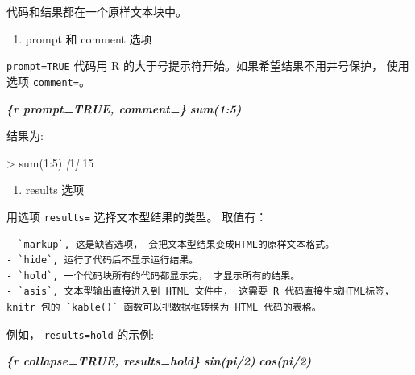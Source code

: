 \documentclass[
]{book}
\newenvironment{Shaded}{\begin{snugshade}}{\end{snugshade}}
\newcommand{\AttributeTok}[1]{\textcolor[rgb]{0.77,0.63,0.00}{#1}}
\newcommand{\CommentTok}[1]{\textcolor[rgb]{0.56,0.35,0.01}{\textit{#1}}}
\newcommand{\InformationTok}[1]{\textcolor[rgb]{0.56,0.35,0.01}{\textbf{\textit{#1}}}}
\newcommand{\OtherTok}[1]{\textcolor[rgb]{0.56,0.35,0.01}{#1}}
\providecommand{\tightlist}{%
  \setlength{\itemsep}{0pt}\setlength{\parskip}{0pt}}
\begin{document}
代码和结果都在一个原样文本块中。

\begin{enumerate}
\def\labelenumi{\arabic{enumi}.}
\setcounter{enumi}{3}
\tightlist
\item
  prompt 和 comment 选项
\end{enumerate}

\texttt{prompt=TRUE} 代码用 R 的大于号提示符开始。如果希望结果不用井号保护，
使用选项 \texttt{comment=\textquotesingle{}\textquotesingle{}}。

\begin{Shaded}
\begin{Highlighting}[]
\InformationTok{\textasciigrave{}\textasciigrave{}\textasciigrave{}\{r prompt=TRUE, comment=\textquotesingle{}\textquotesingle{}\} }
\InformationTok{sum(1:5)}
\InformationTok{\textasciigrave{}\textasciigrave{}\textasciigrave{}}
\end{Highlighting}
\end{Shaded}

结果为:

\begin{Shaded}
\begin{Highlighting}[]
\AttributeTok{\textgreater{} sum(1:5)}
\CommentTok{[}\OtherTok{1}\CommentTok{]}\AttributeTok{ 15}
\end{Highlighting}
\end{Shaded}

\begin{enumerate}
\def\labelenumi{\arabic{enumi}.}
\setcounter{enumi}{4}
\tightlist
\item
  results 选项
\end{enumerate}

用选项 \texttt{results=} 选择文本型结果的类型。 取值有：

\begin{verbatim}
- `markup`, 这是缺省选项， 会把文本型结果变成HTML的原样文本格式。
- `hide`, 运行了代码后不显示运行结果。
- `hold`, 一个代码块所有的代码都显示完， 才显示所有的结果。
- `asis`, 文本型输出直接进入到 HTML 文件中， 这需要 R 代码直接生成HTML标签， knitr 包的 `kable()` 函数可以把数据框转换为 HTML 代码的表格。
\end{verbatim}

例如， \texttt{results=\textquotesingle{}hold\textquotesingle{}} 的示例:

\begin{Shaded}
\begin{Highlighting}[]
\InformationTok{\textasciigrave{}\textasciigrave{}\textasciigrave{}\{r collapse=TRUE, results=\textquotesingle{}hold\textquotesingle{}\} }
\InformationTok{sin(pi/2)}
\InformationTok{cos(pi/2)}
\InformationTok{\textasciigrave{}\textasciigrave{}\textasciigrave{}}
\end{Highlighting}
\end{Shaded}
\end{document}
